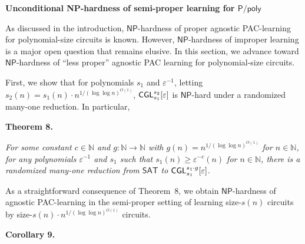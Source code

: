 \par\medskip\noindent\textbf{Unconditional NP-hardness of semi-proper learning for ${\mathsf{P}}/{\mathsf{poly}}$
}\par




As discussed in the introduction, ${\mathsf{NP}}$-hardness of proper agnostic PAC-learning for polynomial-size circuits is known. However, ${\mathsf{NP}}$-hardness of improper learning is a major open question that remains elusive. In this section, we advance toward ${\mathsf{NP}}$-hardness of “less proper” agnostic PAC learning for polynomial-size circuits.\par




First, we show that for polynomials $s_{1}$ and $\varepsilon^{-1}$, letting $s_{2}(n)=s_{1}(n)\cdot n^{1/(\log\log n)^{O(1)}}$, ${\sf CGL}_{s_{1}}^{s_{2}}[\varepsilon]$ is ${\mathsf{NP}}$-hard under a randomized many-one reduction. In particular,\par





\par\medskip\noindent\textbf{
\textbf{Theorem 8}\textbf{.}
}\par



\emph{For some constant $c\in\mathbb{N}$ and $g:\mathbb{N}\to\mathbb{N}$ with $g(n)=n^{1/(\log\log n)^{O(1)}}$ for $n\in\mathbb{N}$, for any polynomials $\varepsilon^{-1}$ and $s_{1}$ such that $s_{1}(n)\geq\varepsilon^{-c}(n)$ for $n\in\mathbb{N}$, there is a randomized many-one reduction from ${\mathsf{SAT}}$ to ${\sf CGL}_{s_{1}}^{s_{1}\cdot g}[\varepsilon]$.}\par






As a straightforward consequence of Theorem 8, we obtain ${\mathsf{NP}}$-hardness of agnostic PAC-learning in the semi-proper setting of learning size-$s(n)$ circuits by size-$s(n)\cdot n^{1/(\log\log n)^{O(1)}}$ circuits.\par





\par\medskip\noindent\textbf{
\textbf{Corollary 9}\textbf{.}
}\par



